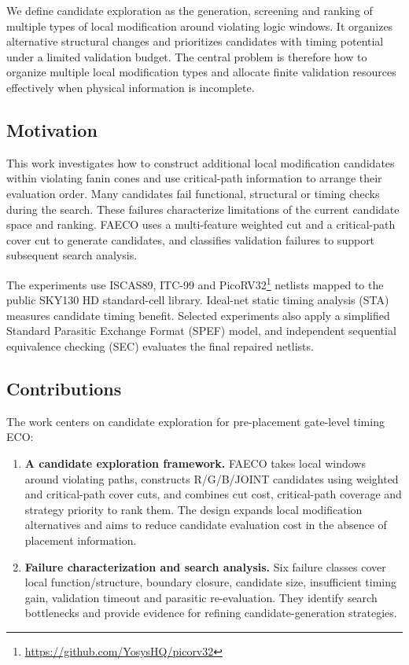 \documentclass[preprint,12pt]{elsarticle}
\begin{document}
We define candidate exploration as the generation, screening and ranking of multiple types of local modification around violating logic windows. It organizes alternative structural changes and prioritizes candidates with timing potential under a limited validation budget. The central problem is therefore how to organize multiple local modification types and allocate finite validation resources effectively when physical information is incomplete.

\subsection{Motivation}
This work investigates how to construct additional local modification candidates within violating fanin cones and use critical-path information to arrange their evaluation order. Many candidates fail functional, structural or timing checks during the search. These failures characterize limitations of the current candidate space and ranking. FAECO uses a multi-feature weighted cut and a critical-path cover cut to generate candidates, and classifies validation failures to support subsequent search analysis.

The experiments use ISCAS89\cite{iscas89}, ITC-99\cite{itc99} and PicoRV32\footnote{\url{https://github.com/YosysHQ/picorv32}} netlists mapped to the public SKY130 HD standard-cell library. Ideal-net static timing analysis (STA) measures candidate timing benefit. Selected experiments also apply a simplified Standard Parasitic Exchange Format (SPEF) model, and independent sequential equivalence checking (SEC) evaluates the final repaired netlists.

\subsection{Contributions}
The work centers on candidate exploration for pre-placement gate-level timing ECO:
\begin{enumerate}
\item \textbf{A candidate exploration framework.} FAECO takes local windows around violating paths, constructs R/G/B/JOINT candidates using weighted and critical-path cover cuts, and combines cut cost, critical-path coverage and strategy priority to rank them. The design expands local modification alternatives and aims to reduce candidate evaluation cost in the absence of placement information.
\item \textbf{Failure characterization and search analysis.} Six failure classes cover local function/structure, boundary closure, candidate size, insufficient timing gain, validation timeout and parasitic re-evaluation. They identify search bottlenecks and provide evidence for refining candidate-generation strategies.
\end{enumerate}
\end{document}
